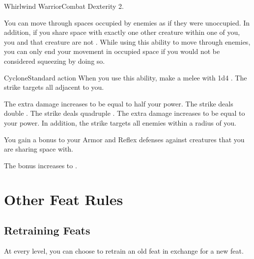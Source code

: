   \begin{feat}{Whirlwind Warrior}{Combat}
    \featpre Dexterity 2.

     You can move through spaces occupied by enemies as if they were unoccupied.
    In addition, if you share space with exactly one other creature within one  of you, you and that creature are not \squeezing.
    While using this ability to move through enemies, you can only end your movement in occupied space if you would not be considered squeezing by doing so.

    \begin{activeability}{Cyclone}{Standard action}
      \rankline
      When you use this ability, make a melee  with 1d4 .
      The strike targets all  adjacent to you.

      \rankline
       The extra damage increases to be equal to half your power.
       The strike deals double .
       The strike deals quadruple .
       The extra damage increases to be equal to your power.
      In addition, the strike targets all enemies within a \smallarea radius of you.
    \end{activeability}

     You gain a  bonus to your Armor and Reflex defenses against creatures that you are sharing space with.

     The bonus increases to .
  \end{feat}

\section{Other Feat Rules}

  \subsection{Retraining Feats}
    At every level, you can choose to retrain an old feat in exchange for a new feat.
